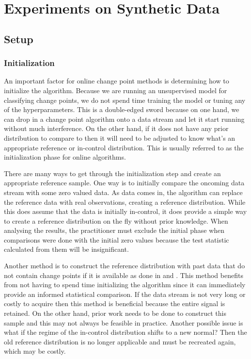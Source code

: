 \chapter{Experiments on Synthetic Data}
\section{Setup}
\label{experiments}
\subsection{Initialization}
An important factor for online change point methods is determining how to initialize the algorithm. Because we are running an unsupervised model for classifying change points, we do not spend time training the model or tuning any of the hyperparameters. This is a double-edged sword because on one hand, we can drop in a change point algorithm onto a data stream and let it start running without much interference. On the other hand, if it does not have any prior distribution to compare to then it will need to be adjusted to know what's an appropriate reference or in-control distribution. This is usually referred to as the initialization phase for online algorithms.

There are many ways to get through the initialization step and create an appropriate reference sample. One way is to initially compare the oncoming data stream with some zero valued data. As data comes in, the algorithm can replace the reference data with real observations, creating a reference distribution. While this does assume that the data is initially in-control, it does provide a simple way to create a reference distribution on the fly without prior knowledge. When analysing the results, the practitioner must exclude the initial phase when comparisons were done with the initial zero values because the test statistic calculated from them will be insignificant. 

Another method is to construct the reference distribution with past data that do not contain change points if it is available as done in \cite{li2015m} and \cite{flynn2019change}. This method benefits from not having to spend time initializing the algorithm since it can immediately provide an informed statistical comparison. If the data stream is not very long or costly to acquire then this method is beneficial because the entire signal is retained.  On the other hand, prior work needs to be done to construct this sample and this may not always be feasible in practice. Another possible issue is what if the regime of the in-control distribution shifts to a new normal? Then the old reference distribution is no longer applicable and must be recreated again, which may be costly. 

